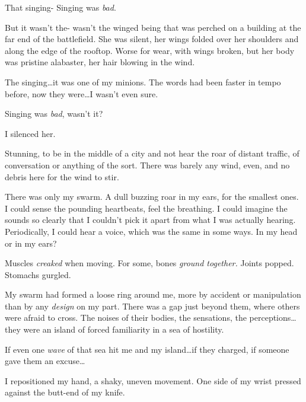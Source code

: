 That singing-  Singing was \emph{bad}.



But it wasn't the- wasn't the winged being that was perched on a building at the far end of the battlefield.  She was silent, her wings folded over her shoulders and along the edge of the rooftop.  Worse for wear, with wings broken, but her body was pristine alabaster, her hair blowing in the wind.



The singing\ldots it was one of my minions.  The words had been faster in tempo before, now they were\ldots I wasn't even sure.



Singing was \emph{bad}, wasn't it?



I silenced her.



Stunning, to be in the middle of a city and not hear the roar of distant traffic, of conversation or anything of the sort.  There was barely any wind, even, and no debris here for the wind to stir.



There was only my swarm.  A dull buzzing roar in my ears, for the smallest ones.  I could sense the pounding heartbeats, feel the breathing.  I could imagine the sounds so clearly that I couldn't pick it apart from what I was actually hearing.  Periodically, I could hear a voice, which was the same in some ways.  In my head or in my ears?



Muscles \emph{creaked} when moving.  For some, bones \emph{ground together}\emph{.  }Joints popped.  Stomachs gurgled.



My swarm had formed a loose ring around me, more by accident or manipulation than by any \emph{design} on my part.  There was a gap just beyond them, where others were afraid to cross.  The noises of their bodies, the sensations, the perceptions\ldots they were an island of forced familiarity in a sea of hostility.



If even one \emph{wave} of that sea hit me and my island\ldots if they charged, if someone gave them an excuse\ldots



I repositioned my hand, a shaky, uneven movement.  One side of my wrist pressed against the butt-end of my knife.



